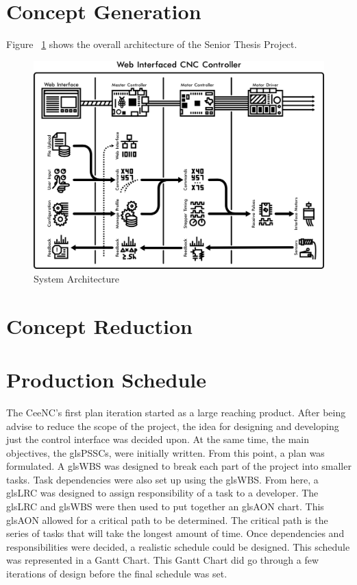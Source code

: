 
\section{Concept Generation}
Figure ~\ref{fig:architecture} shows the overall architecture of the Senior Thesis Project.

\begin{figure}[h]
	\centering
	\includegraphics[width=1\textwidth]{architecture.png}
	\caption{System Architecture}
	\label{fig:architecture}
\end{figure}

\section{Concept Reduction}
\section{Production Schedule}
The CeeNC's first plan iteration started as a large reaching product.
After being advise to reduce the scope of the project, the idea for designing and developing just the control interface was decided upon.
At the same time, the main objectives, the gls{PSSC}s, were initially written.
From this point, a plan was formulated.
A gls{WBS} was designed to break each part of the project into smaller tasks.
Task dependencies were also set up using the gls{WBS}. 
From here, a gls{LRC} was designed to assign responsibility of a task to a developer.
The gls{LRC} and gls{WBS} were then used to put together an gls{AON} chart.
This gls{AON} allowed for a critical path to be determined. 
The critical path is the series of tasks that will take the longest amount of time.
Once dependencies and responsibilities were decided, a realistic schedule could be designed.
This schedule was represented in a Gantt Chart.
This Gantt Chart did go through a few iterations of design before the final schedule was set.

